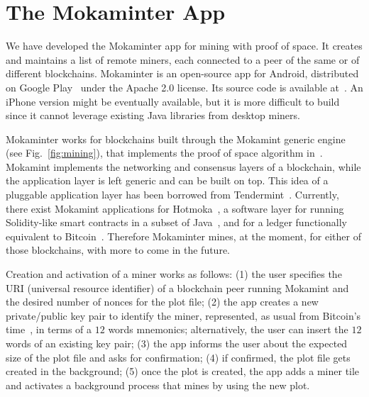 \section{The Mokaminter App}\label{sec:mokaminter}

We have developed the Mokaminter app for mining with proof of space.
It creates and maintains a list of remote miners, each connected
to a peer of the same or of different blockchains.
Mokaminter is an open-source app for Android, distributed
on Google Play~\cite{mokaminter-google-play} under
the Apache 2.0 license. Its source code is available at~\cite{mokaminter-source-code}.
An iPhone version might be eventually available,
but it is more difficult to build since
it cannot leverage existing Java libraries from desktop miners.

Mokaminter works for blockchains built through
the Mokamint generic engine~\cite{mokamint-source-code} (see Fig.~\ref{fig:mining}), that implements
the proof of space algorithm in~\cite{Spoto25}. Mokamint
implements the networking and consensus layers of
a blockchain, while the application layer is left generic and can be built on top.
This idea of a pluggable application layer has been borrowed from Tendermint~\cite{Kwon14}.
Currently, there exist Mokamint applications for Hotmoka~\cite{hotmoka}, a software layer
for running Solidity-like smart contracts in a subset of Java~\cite{Spoto19}, and
for a ledger functionally
equivalent to Bitcoin~\cite{bitcoin-mokamint}. Therefore Mokaminter mines, at the moment,
for either of those blockchains, with more to come in the future.

Creation and activation of a miner works as follows:
(1) the user specifies the URI (universal resource identifier) of a
blockchain peer running Mokamint and the desired number of nonces for the plot file;
(2) the app creates a new private/public key pair to identify the miner,
  represented, as usual from Bitcoin's time~\cite{Antonopoulos23},
  in terms of a $12$ words mnemonics; %
  alternatively, the user can insert the $12$ words of an existing key pair;
(3) the app informs the user about the expected size of the plot file
  and asks for confirmation; %
(4) if confirmed, the plot file gets created in the background;
(5) once the plot is created, the app adds a miner tile
  and activates a background process that mines by using the new plot.

